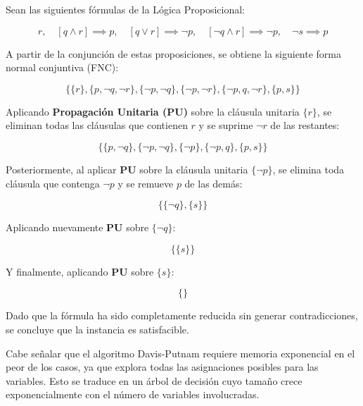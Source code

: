 Sean las siguientes fórmulas de la Lógica Proposicional:

\begin{equation*}
    r, \quad [q \land r] \implies p, \quad [q \lor r] \implies \neg p, \quad [\neg q \land r] \implies \neg p, \quad \neg s \implies p
\end{equation*}

A partir de la conjunción de estas proposiciones, se obtiene la siguiente forma normal conjuntiva (FNC):

\begin{equation*}
    \{\{r\}, \{p,\neg q, \neg r\}, \{\neg p, \neg q\}, \{\neg p, \neg r\}, \{\neg p, q, \neg r\}, \{p, s\}\}
\end{equation*}

Aplicando \textbf{Propagación Unitaria (PU)} sobre la cláusula unitaria $\{r\}$, se eliminan todas las cláusulas que contienen $r$ y se suprime $\neg r$ de las restantes:

\begin{equation*}
    \{\{p,\neg q\}, \{\neg p,\neg q\}, \{\neg p\}, \{\neg p,q\}, \{p,s\}\}
\end{equation*}

Posteriormente, al aplicar \textbf{PU} sobre la cláusula unitaria $\{\neg p\}$, se elimina toda cláusula que contenga $\neg p$ y se remueve $p$ de las demás:

\begin{equation*}
    \{\{\neg q\}, \{s\}\}
\end{equation*}

Aplicando nuevamente \textbf{PU} sobre $\{\neg q\}$:

\begin{equation*}
    \{\{s\}\}
\end{equation*}

Y finalmente, aplicando \textbf{PU} sobre $\{s\}$:

\begin{equation*}
    \{\}
\end{equation*}

Dado que la fórmula ha sido completamente reducida sin generar contradicciones, se concluye que la instancia es satisfacible.

Cabe señalar que el algoritmo Davis-Putnam requiere memoria exponencial en el peor de los casos, ya que explora todas las asignaciones posibles para las variables. Esto se traduce en un árbol de decisión cuyo tamaño crece exponencialmente con el número de variables involucradas.

